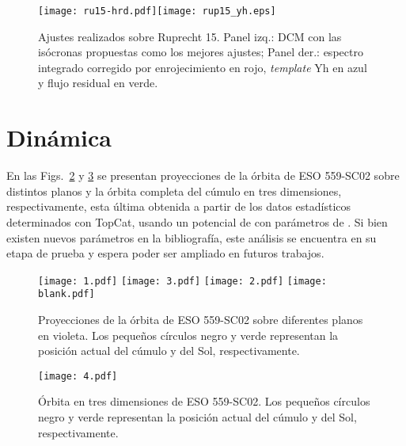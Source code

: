 \documentclass[baaa]{baaa}
\begin{document}
\begin{figure}
    \centering
    \texttt{[image: ru15-hrd.pdf]}\texttt{[image: rup15\_yh.eps]}
    \caption{Ajustes realizados sobre Ruprecht 15. Panel izq.: DCM con las is\'ocronas propuestas como los mejores ajustes; Panel der.: espectro integrado corregido por enrojecimiento en rojo, {\em template} Yh en azul y flujo residual en verde.}
    \label{fig3}
\end{figure}

\section{Din\'amica}\label{s_5}
En las Figs.~\ref{fig4} y \ref{fig5} se presentan proyecciones de la \'orbita de ESO 559-SC02 sobre distintos planos y la \'orbita completa del c\'umulo en tres dimensiones, respectivamente, esta \'ultima obtenida a partir de los datos estad\'isticos determinados con {\sc TopCat}, usando un potencial de \cite{M75} con par\'ametros de \cite{AS91}. Si bien existen nuevos par\'ametros en la bibliograf\'ia, este an\'alisis se encuentra en su etapa de prueba y espera poder ser ampliado en futuros trabajos.

\begin{figure}
    \centering
    \texttt{[image: 1.pdf]}
    \hfill
    \texttt{[image: 3.pdf]}
    \texttt{[image: 2.pdf]}
    \hfill
    \texttt{[image: blank.pdf]}
    \caption{Proyecciones de la \'orbita de ESO 559-SC02 sobre diferentes planos en violeta. Los peque\~nos c\'irculos negro y verde representan la posici\'on actual del c\'umulo y del Sol, respectivamente.}
    \label{fig4}
\end{figure}

\begin{figure}
    \centering
    \texttt{[image: 4.pdf]}
    \caption{\'Orbita en tres dimensiones de ESO 559-SC02. Los peque\~nos c\'irculos negro y verde representan la posici\'on actual del c\'umulo y del Sol, respectivamente.}
    \label{fig5}
\end{figure}
\end{document}

